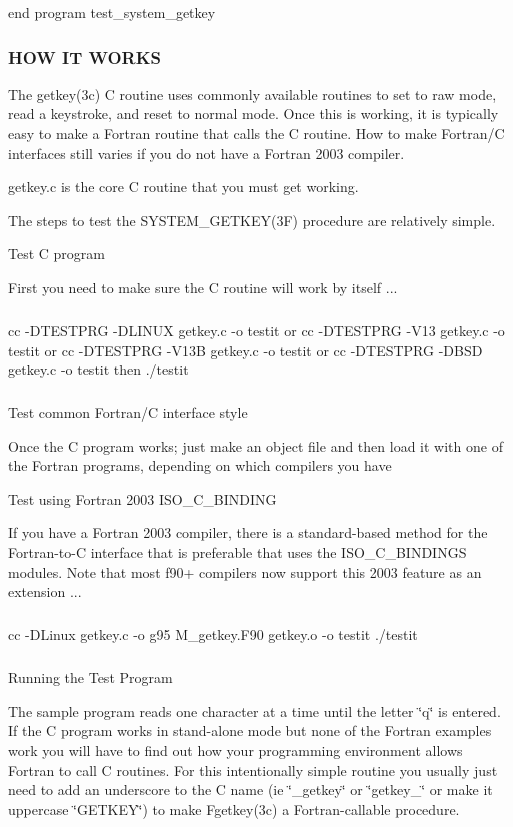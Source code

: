 end program test\+\_\+system\+\_\+getkey

\subsubsection*{H\+OW IT W\+O\+R\+KS}

\begin{DoxyVerb}The getkey(3c) C routine uses commonly available routines to set to
raw mode, read a keystroke, and reset to normal mode. Once this is
working, it is typically easy to make a Fortran routine that calls
the C routine. How to make Fortran/C interfaces still varies if you
do not have a Fortran 2003 compiler.

getkey.c is the core C routine that you must get working.

The steps to test the SYSTEM_GETKEY(3F) procedure are relatively simple.
\end{DoxyVerb}


Test C program

First you need to make sure the C routine will work by itself ...

\subparagraph*{}

cc -\/\+D\+T\+E\+S\+T\+P\+RG -\/\+D\+L\+I\+N\+UX getkey.\+c -\/o testit or cc -\/\+D\+T\+E\+S\+T\+P\+RG -\/\+V13 getkey.\+c -\/o testit or cc -\/\+D\+T\+E\+S\+T\+P\+RG -\/\+V13B getkey.\+c -\/o testit or cc -\/\+D\+T\+E\+S\+T\+P\+RG -\/\+D\+B\+SD getkey.\+c -\/o testit then ./testit \subparagraph*{}

Test common Fortran/C interface style

Once the C program works; just make an object file and then load it with one of the Fortran programs, depending on which compilers you have

Test using Fortran 2003 I\+S\+O\+\_\+\+C\+\_\+\+B\+I\+N\+D\+I\+NG

If you have a Fortran 2003 compiler, there is a standard-\/based method for the Fortran-\/to-\/C interface that is preferable that uses the I\+S\+O\+\_\+\+C\+\_\+\+B\+I\+N\+D\+I\+N\+GS modules. Note that most f90+ compilers now support this 2003 feature as an extension ...

\subparagraph*{}

cc -\/\+D\+Linux getkey.\+c -\/o g95 M\+\_\+getkey.\+F90 getkey.\+o -\/o testit ./testit \subparagraph*{}

Running the Test Program

The sample program reads one character at a time until the letter \char`\"{}q\char`\"{} is entered. If the C program works in stand-\/alone mode but none of the Fortran examples work you will have to find out how your programming environment allows Fortran to call C routines. For this intentionally simple routine you usually just need to add an underscore to the C name (ie \char`\"{}\+\_\+getkey\char`\"{} or \char`\"{}getkey\+\_\+\char`\"{} or make it uppercase \char`\"{}\+G\+E\+T\+K\+E\+Y\char`\"{}) to make Fgetkey(3c) a Fortran-\/callable procedure.

